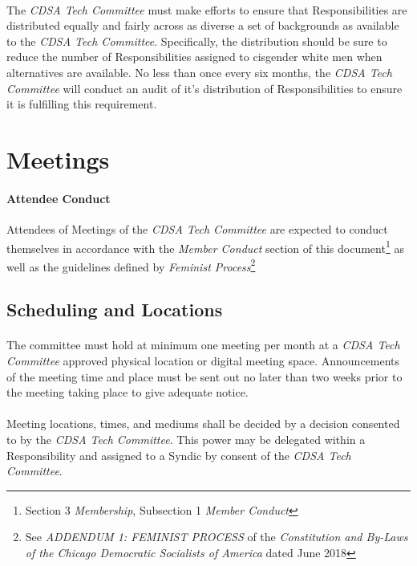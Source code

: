 \documentclass[12pt,letter,twocolumn,oneside,draft]{article}
\newcommand{\cname}{\emph{CDSA Tech Committee}}
\begin{document}
\paragraph{}
The \cname{} must make efforts to ensure that Responsibilities are distributed
equally and fairly across as diverse a set of backgrounds as available to the
\cname{}.  Specifically, the distribution should be sure to reduce the number
of Responsibilities assigned to cisgender white men when alternatives are
available. No less than once every six months, the \cname{} will conduct an
audit of it's distribution of Responsibilities to ensure it is fulfilling this
requirement.


\section{Meetings}

\paragraph{Attendee Conduct}
Attendees of Meetings of the \cname{} are expected to conduct themselves in
accordance with the \emph{Member Conduct} section of this
document\footnote{Section 3 \emph{Membership}, Subsection 1 \emph{Member
Conduct}} as well as the guidelines defined by \emph{Feminist
Process}\footnote{See \emph{ADDENDUM 1: FEMINIST PROCESS} of the
\emph{Constitution and By-Laws of the Chicago Democratic Socialists of America}
dated June 2018}

\subsection{Scheduling and Locations}

\paragraph{}
The committee must hold at minimum one meeting per month at a \cname{} approved
physical location or digital meeting space. Announcements of the meeting time
and place must be sent out no later than two weeks prior to the meeting taking
place to give adequate notice.

\paragraph{}
Meeting locations, times, and mediums shall be decided by a decision consented
to by the \cname{}. This power may be delegated within a Responsibility and
assigned to a Syndic by consent of the \cname{}.
\end{document}
